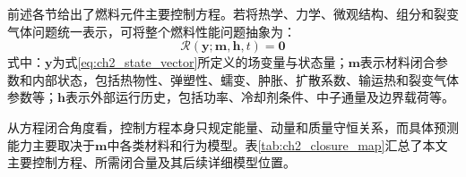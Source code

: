 \label{sec:ch2_closure_summary}

前述各节给出了燃料元件主要控制方程。若将热学、力学、微观结构、组分和裂变气体问题统一表示，可将整个燃料性能问题抽象为：
\begin{equation}
	\mathcal R
	\left(
	\mathbf y;\mathbf m,\mathbf h,t
	\right)
	=\mathbf 0
	\label{eq:ch2_global_residual}
\end{equation}
\noindent 式中：$\mathbf y$为式\eqref{eq:ch2_state_vector}所定义的场变量与状态量；$\mathbf m$表示材料闭合参数和内部状态，包括热物性、弹塑性、蠕变、肿胀、扩散系数、输运热和裂变气体参数等；$\mathbf h$表示外部运行历史，包括功率、冷却剂条件、中子通量及边界载荷等。

从方程闭合角度看，控制方程本身只规定能量、动量和质量守恒关系，而具体预测能力主要取决于$\mathbf m$中各类材料和行为模型。表\ref{tab:ch2_closure_map}汇总了本文主要控制方程、所需闭合量及其后续详细模型位置。

